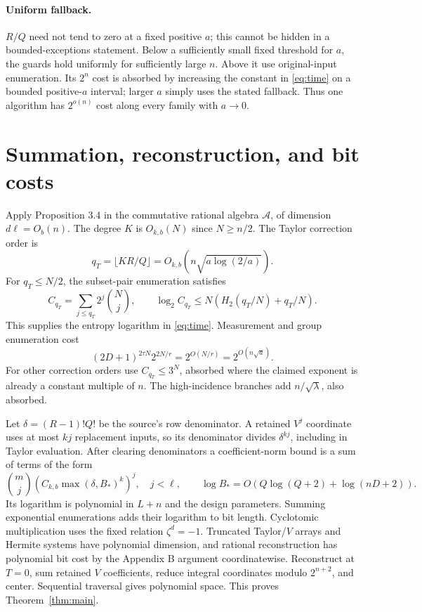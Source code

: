 \documentclass[11pt,a4paper]{article}
\theoremstyle{remark}\newtheorem{remark}[theorem]{Remark}
\begin{document}
\paragraph{Uniform fallback.}
$R/Q$ need not tend to zero at a fixed positive $a$; this cannot be
hidden in a bounded-exceptions statement. Below a sufficiently small
fixed threshold for $a$, the guards hold uniformly for sufficiently
large $n$. Above it use original-input enumeration. Its $2^n$ cost is
absorbed by increasing the constant in \eqref{eq:time} on a bounded
positive-$a$ interval; larger $a$ simply uses the stated fallback.
Thus one algorithm has $2^{o(n)}$ cost along every family with $a\to0$.

\section{Summation, reconstruction, and bit costs}
Apply Proposition 3.4 in the commutative rational algebra $\mathcal A$,
of dimension $d\ell=O_b(n)$. The degree $K$ is $O_{k,b}(N)$ since
$N\ge n/2$. The Taylor correction order is
\[
 q_T=\lfloor KR/Q\rfloor=O_{k,b}(n\sqrt{a\log(2/a)}).
\]
For $q_T\le N/2$, the subset-pair enumeration satisfies
\[
 C_{q_T}=\sum_{j\le q_T}2^j\binom Nj,
 \qquad \log_2 C_{q_T}\le N(H_2(q_T/N)+q_T/N).
\]
This supplies the entropy logarithm in \eqref{eq:time}.
Measurement and group enumeration cost
\[
 (2D+1)^{2\tau N}2^{2N/r}=2^{O(N/r)}=2^{O(n\sqrt a)}.
\]
For other correction orders use $C_{q_T}\le3^N$, absorbed where the
claimed exponent is already a constant multiple of $n$. The high-incidence
branches add $n/\sqrt\lambda$, also absorbed.

Let $\delta=(R-1)!Q!$ be the source's row denominator. A retained
$V^j$ coordinate uses at most $kj$ replacement inputs, so its denominator
divides $\delta^{kj}$, including in Taylor evaluation. After clearing
denominators a coefficient-norm bound is a sum of terms of the form
\[
 \binom mj(C_{k,b}\max(\delta,B_*)^k)^j,
 \quad j<\ell,\qquad
 \log B_*=O(Q\log(Q+2)+\log(nD+2)).
\]
Its logarithm is polynomial in $L+n$ and the design parameters.
Summing exponential enumerations adds their logarithm to bit length.
Cyclotomic multiplication uses the fixed relation $\zeta^d=-1$.
Truncated Taylor/$V$ arrays and Hermite systems have polynomial
dimension, and rational reconstruction has polynomial bit cost by
the Appendix B argument coordinatewise. Reconstruct at $T=0$, sum
retained $V$ coefficients, reduce integral coordinates modulo $2^{n+2}$,
and center. Sequential traversal gives polynomial space. This proves
Theorem~\ref{thm:main}.
\end{document}
